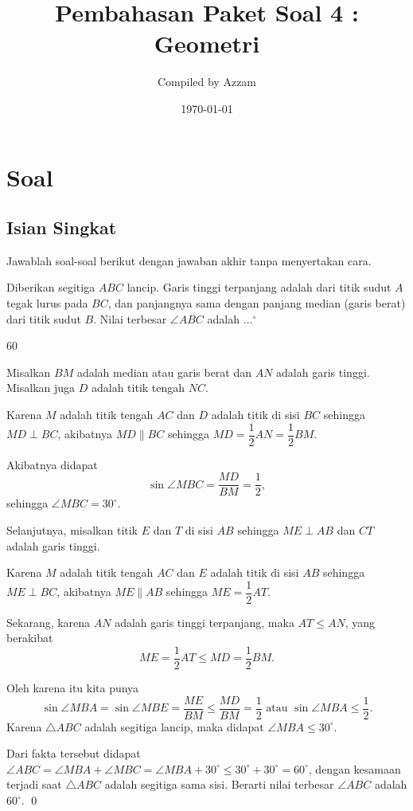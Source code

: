 \documentclass[12pt]{scrartcl}
\begin{document}
	\title{Pembahasan Paket Soal 4 : Geometri} %
	\date{\today}
	\author{Compiled by Azzam}
	\maketitle

\renewcommand*\contentsname{Daftar Isi}
\tableofcontents

\newpage
	\newpage
	
	\section{Soal}
\subsection{Isian Singkat}
Jawablah soal-soal berikut dengan jawaban akhir tanpa menyertakan cara.

	\begin{soalbaru}
		Diberikan segitiga $ABC$ lancip. Garis tinggi terpanjang adalah dari titik sudut $A$ tegak
			lurus pada $BC$, dan panjangnya sama dengan panjang median (garis berat) dari titik sudut $B$.
			Nilai terbesar $\angle ABC$ adalah $\dots^\circ$
			
			\begin{jawaban}
			60
			\end{jawaban}
			\begin{solusi}
			Misalkan $BM$ adalah median atau garis berat dan $AN$ adalah garis tinggi. Misalkan juga $D$ adalah titik tengah $NC$.
			
			Karena $M$ adalah titik tengah $AC$ dan $D$ adalah titik di sisi $BC$ sehingga $MD \perp BC$, akibatnya $MD \parallel BC$ sehingga $MD=\dfrac{1}{2}AN=\dfrac{1}{2}BM$.
			
			Akibatnya didapat $$\sin \angle MBC = \dfrac{MD}{BM} = \dfrac{1}{2},$$ sehingga $\angle MBC = 30^\circ$.
			
			Selanjutnya, misalkan titik $E$ dan $T$ di sisi $AB$ sehingga $ME \perp AB$ dan $CT$ adalah garis tinggi.
			
			Karena $M$ adalah titik tengah $AC$ dan $E$ adalah titik di sisi $AB$ sehingga $ME \perp BC$, akibatnya $ME \parallel AB$ sehingga $ME=\dfrac{1}{2}AT$.
			
			Sekarang, karena $AN$ adalah garis tinggi terpanjang, maka $AT \le AN$, yang berakibat $$ME=\dfrac{1}{2}AT \le MD=\dfrac{1}{2}BM.$$
			
			Oleh karena itu kita punya $$\sin \angle MBA = \sin \angle MBE = \dfrac{ME}{BM} \le \dfrac{MD}{BM} = \dfrac{1}{2} \text{ atau } \sin \angle MBA \le \dfrac{1}{2}.$$ 
			Karena $\triangle ABC$ adalah segitiga lancip, maka didapat $\angle MBA \le 30^\circ$.
			
			Dari fakta tersebut didapat $\angle ABC = \angle MBA + \angle MBC = \angle MBA  + 30^\circ \le 30^\circ + 30^\circ = 60^\circ$, dengan kesamaan terjadi saat $\triangle ABC$ adalah segitiga sama sisi. Berarti nilai terbesar $\angle ABC$ adalah $60^\circ$. \qed
			\end{solusi}
	\end{soalbaru}
	
\end{document}
